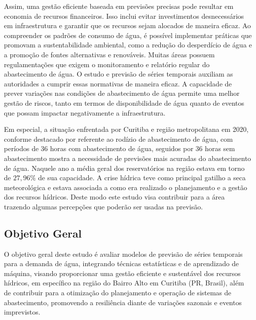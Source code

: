 Assim, uma gestão eficiente baseada em previsões precisas pode resultar em economia de recursos financeiros. Isso inclui evitar investimentos desnecessários em infraestrutura e garantir que os recursos sejam alocados de maneira eficaz. Ao compreender os padrões de consumo de água, é possível implementar práticas que promovam a sustentabilidade ambiental, como a redução do desperdício de água e a promoção de fontes alternativas e renováveis. Muitas áreas possuem regulamentações que exigem o monitoramento e relatório regular do abastecimento de água. O estudo e previsão de séries temporais auxiliam as autoridades a cumprir essas normativas de maneira eficaz. A capacidade de prever variações nas condições de abastecimento de água permite uma melhor gestão de riscos, tanto em termos de disponibilidade de água quanto de eventos que possam impactar negativamente a infraestrutura.

Em especial, a situação enfrentada por Curitiba e região metropolitana em 2020, conforme destacado por \cite{vasconcelos_2020} referente ao rodízio de abastecimento de água, com períodos de 36 horas com abastecimento de água, seguidos por 36 horas sem abastecimento mostra a necessidade de previsões mais acuradas do abastecimento de água. Naquele ano a média geral dos reservatórios na região estava em torno de $27,96\%$ de sua capacidade. A crise hídrica teve como principal gatilho a seca meteorológica e estava associada a como era realizado o planejamento e a gestão dos recursos hídricos. Deste modo este estudo visa contribuir para a área trazendo algumas percepções que poderão ser usadas na previsão.

\subsection{Objetivo Geral} \label{subsec:objetivos}

O objetivo geral deste estudo é avaliar modelos de previsão de séries temporais para a demanda de água, integrando técnicas estatísticas e de aprendizado de máquina, visando proporcionar uma gestão eficiente e sustentável dos recursos hídricos, em específico na região do Bairro Alto em Curitiba (PR, Brasil), além de contribuir para a otimização do planejamento e operação de sistemas de abastecimento, promovendo a resiliência diante de variações sazonais e eventos imprevistos.

